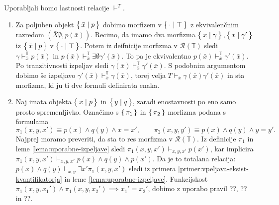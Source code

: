 \documentclass[../kategoricna_logika.tex]{subfiles}
\begin{document}
\begin{dokaz}
  Uporabljali bomo lastnosti relacije $\vdash^T$.
  \begin{enumerate}[label=(\roman*)]
  \item Za poljuben objekt $\left\lbrace\,\bar{x} \mid p\,\right\rbrace$ dobimo morfizem v $\left\lbrace\,\cdot \mid \top\,\right\rbrace$
    z ekvivalenčnim razredom $(\bar{X}\emptyset, p(\bar{x}))$.
    Recimo, da imamo dva morfizma $\left\lbrace\,\bar{x} \mid \gamma\,\right\rbrace, \left\lbrace\,\bar{x} \mid \gamma'\,\right\rbrace$
    iz $\left\lbrace\,\bar{x} \mid p\,\right\rbrace$ v $\left\lbrace\,\cdot \mid \top\,\right\rbrace$.
    Potem iz deifnicije morfizma v $\mathcal{R}(\mathbb{T})$ sledi
    $\gamma \vdash_{\bar{x}}^{\mathbb{T}} p(\bar{x})$ in
    $p(\bar{x}) \vdash_{\bar{x}}^{\mathbb{T}} \exists \emptyset \gamma'(\bar{x})$.
    To pa je ekvivalentno $p(\bar{x}) \vdash_{\bar{x}}^{\mathbb{T}} \gamma'(\bar{x})$.
    Po tranzitivnosti izpeljav sledi $\gamma(\bar{x}) \vdash_{\bar{x}}^{\mathbb{T}} \gamma'(\bar{x})$.
    S podobnim argumentom dobimo še izpeljavo $\gamma'(\bar{x}) \vdash_{\bar{x}}^{\mathbb{T}} \gamma(\bar{x}) $,
    torej velja $T \vdash_{\bar{x}} \gamma(\bar{x}) \gamma'(\bar{x})$
    in sta morfizma, ki ju ti dve formuli definirata enaka.
    
  \item Naj imata objekta $\left\lbrace\,x \mid p\,\right\rbrace$ in $\left\lbrace\,y \mid q\,\right\rbrace$, zaradi
    enostavnosti po eno samo prosto spremenljivko.  Označimo s
    $\left\lbrace\,\pi_1\,\right\rbrace$ in $\left\lbrace\,\pi_2\,\right\rbrace$ morfizma podana s formulama
    \[ \pi_1(x,y,x') \equiv p(x) \land q(y) \land x=x', \qquad
      \pi_2(x,y,y') \equiv p(x) \land q(y) \land y=y'.
    \]
    Najprej moramo preveriti, da sta to res morfizma v
    $\mathcal{R}(\mathbb{T})$.  Iz definicije $\pi_1$ in leme
    \ref{lema:uporabne-izpeljave} sledi
    $\pi_1(x,y,x') \vdash_{x,y,x'} p(x')$, kar implicira
    $\pi_1(x,y,x') \vdash_{x,y,x'} p(x) \land q(y) \land p(x')$.  Da
    je to totalana relacija:
    $p(x) \land q(y) \vdash_{x,y} \exists x' \pi_1(x,y,x')$ sledi iz
    primera \ref{primer:vpeljava-eksist-kvantifikatorja} in leme
    \ref{lema:uporabne-izpeljave}.  Funkcijskost
    $\pi_1(x,y,x_1') \land \pi_1(x,y,x_2') \implies x_1' = x_2'$,
    dobimo z uporabo pravil ??, ?? in ??.


\end{enumerate}
\end{dokaz}
\end{document}
